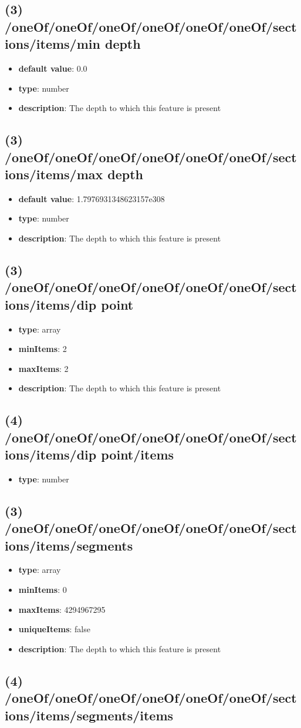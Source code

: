 \subsection{(3) /oneOf/oneOf/oneOf/oneOf/oneOf/oneOf/sections/items/min depth}
\begin{itemize}[leftmargin=3em]\item {\bf default value}: 0.0
\item {\bf type}: number
\item {\bf description}: The depth to which this feature is present
\end{itemize}\subsection{(3) /oneOf/oneOf/oneOf/oneOf/oneOf/oneOf/sections/items/max depth}
\begin{itemize}[leftmargin=3em]\item {\bf default value}: 1.7976931348623157e308
\item {\bf type}: number
\item {\bf description}: The depth to which this feature is present
\end{itemize}\subsection{(3) /oneOf/oneOf/oneOf/oneOf/oneOf/oneOf/sections/items/dip point}
\begin{itemize}[leftmargin=3em]\item {\bf type}: array
\item {\bf minItems}: 2
\item {\bf maxItems}: 2
\item {\bf description}: The depth to which this feature is present
\end{itemize}\subsection{(4) /oneOf/oneOf/oneOf/oneOf/oneOf/oneOf/sections/items/dip point/items}
\begin{itemize}[leftmargin=4em]\item {\bf type}: number
\end{itemize}\subsection{(3) /oneOf/oneOf/oneOf/oneOf/oneOf/oneOf/sections/items/segments}
\begin{itemize}[leftmargin=3em]\item {\bf type}: array
\item {\bf minItems}: 0
\item {\bf maxItems}: 4294967295
\item {\bf uniqueItems}: false
\item {\bf description}: The depth to which this feature is present
\end{itemize}\subsection{(4) /oneOf/oneOf/oneOf/oneOf/oneOf/oneOf/sections/items/segments/items}
